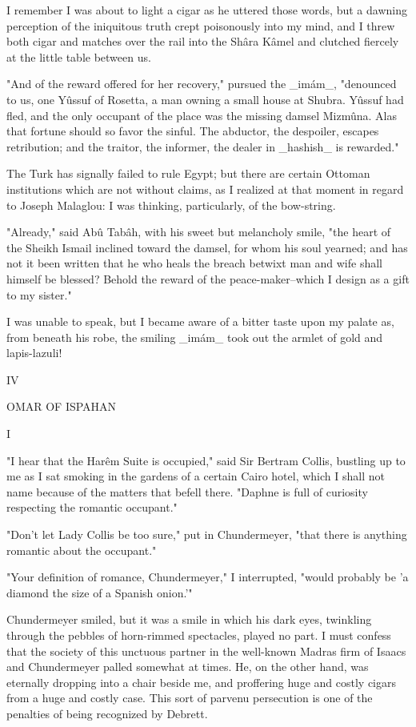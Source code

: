I remember I was about to light a cigar as he uttered those words, but
a dawning perception of the iniquitous truth crept poisonously into my
mind, and I threw both cigar and matches over the rail into the Shâra
Kâmel and clutched fiercely at the little table between us.

"And of the reward offered for her recovery," pursued the _imám_,
"denounced to us, one Yûssuf of Rosetta, a man owning a small house at
Shubra. Yûssuf had fled, and the only occupant of the place was the
missing damsel Mizmûna. Alas that fortune should so favor the sinful.
The abductor, the despoiler, escapes retribution; and the traitor, the
informer, the dealer in _hashish_ is rewarded."

The Turk has signally failed to rule Egypt; but there are certain
Ottoman institutions which are not without claims, as I realized at
that moment in regard to Joseph Malaglou: I was thinking,
particularly, of the bow-string.

"Already," said Abû Tabâh, with his sweet but melancholy smile, "the
heart of the Sheikh Ismail inclined toward the damsel, for whom his
soul yearned; and has not it been written that he who heals the breach
betwixt man and wife shall himself be blessed? Behold the reward of
the peace-maker--which I design as a gift to my sister."

I was unable to speak, but I became aware of a bitter taste upon my
palate as, from beneath his robe, the smiling _imám_ took out the
armlet of gold and lapis-lazuli!




IV

OMAR OF ISPAHAN


I

"I hear that the Harêm Suite is occupied," said Sir Bertram Collis,
bustling up to me as I sat smoking in the gardens of a certain Cairo
hotel, which I shall not name because of the matters that befell
there. "Daphne is full of curiosity respecting the romantic occupant."

"Don't let Lady Collis be too sure," put in Chundermeyer, "that there
is anything romantic about the occupant."

"Your definition of romance, Chundermeyer," I interrupted, "would
probably be 'a diamond the size of a Spanish onion.'"

Chundermeyer smiled, but it was a smile in which his dark eyes,
twinkling through the pebbles of horn-rimmed spectacles, played no
part. I must confess that the society of this unctuous partner in the
well-known Madras firm of Isaacs and Chundermeyer palled somewhat at
times. He, on the other hand, was eternally dropping into a chair
beside me, and proffering huge and costly cigars from a huge and
costly case. This sort of parvenu persecution is one of the penalties
of being recognized by Debrett.

